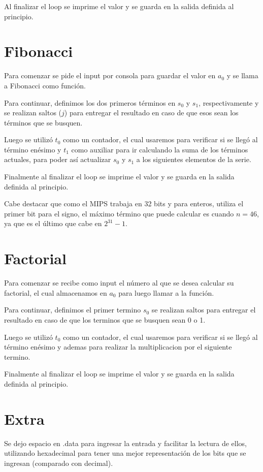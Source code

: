 \documentclass[11pt,letterpaper]{article}
\begin{document}
Al finalizar el loop se imprime el valor y se guarda en la salida definida al principio.


\section{Fibonacci}
Para comenzar se pide el input por consola para guardar el valor en $a_0$ y se llama a Fibonacci como función.

Para continuar, definimos los dos primeros términos en $s_0$ y $s_1$, respectivamente y se realizan saltos ($j$) para entregar el resultado en caso de que esos sean los términos que se busquen.

Luego se utilizó $t_0$ como un contador, el cual usaremos para verificar si se llegó al término enésimo y $t_1$ como auxiliar para ir calculando la suma de los términos actuales, para poder así actualizar $s_0$ y $s_1$ a los siguientes elementos de la serie.

Finalmente al finalizar el loop se imprime el valor y se guarda en la salida definida al principio.

Cabe destacar que como el MIPS trabaja en 32 bits y para enteros, utiliza el primer bit para el signo, el máximo término que puede calcular es cuando $n=46$, ya que es el último que cabe en $2^{31}-1$.

\section{Factorial}
Para comenzar se recibe como input el número al que se desea calcular su factorial, el cual almacenamos en $a_0$ para luego llamar a la función. 

Para continuar, definimos el primer termino  $s_0$ se realizan saltos para entregar el resultado en caso de que los terminos que se busquen sean 0 o 1.

Luego se utilizó $t_0$ como un contador, el cual usaremos para verificar si se llegó al término enésimo y ademas para realizar la multiplicacion por el siguiente termino.

Finalmente al finalizar el loop se imprime el valor y se guarda en la salida definida al principio.



\section{Extra}
Se dejo espacio en .data para ingresar la entrada y facilitar la lectura de ellos, utilizando hexadecimal para tener una mejor representación de los bits que se ingresan (comparado con decimal). 
\end{document}
